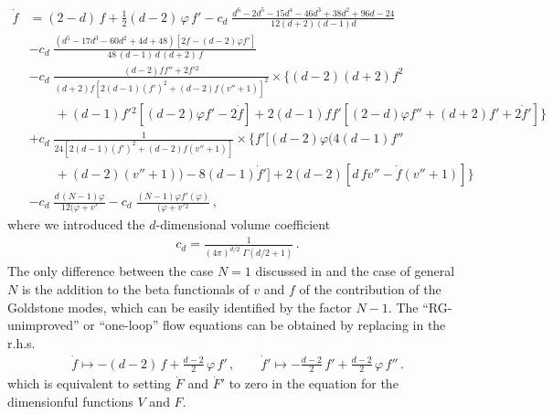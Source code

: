 \documentclass[11pt]{book} %
\begin{document}
\begin{align}
  \dot f &= (2-d) \, f + \frac{1}{2} (d-2) \, \varphi \, f'
    - c_d \; \frac{d^6 - 2 d^5 - 15 d^4 - 46 d^3 + 38 d^2 + 96 d - 24}{12 (d+2) (d-1) d} \nonumber \\[3mm]
  & - c_d \; \frac{ \left( d^5 - 17 d^3 - 60 d^2 + 4 d + 48 \right) \left[ 2 \dot f - (d - 2) \varphi f' \right] }
    { 48 \, (d-1) \, d \, (d+2) \, f } \nonumber \\[3mm]
  & - c_d \; \frac{ (d-2) f f'' + 2 f'{}^2 }
                  { (d+2) f \left[ 2 (d-1) \left(f'\right)^2+(d-2) f \left(v''+1\right) \right]^2 }
                  \times \bigg\{ (d-2) (d+2) f^2 \nonumber \\[3mm]
  &          \quad \quad + (d-1) f'{}^2 \left[ (d-2) \varphi  f' - 2 \dot f \right]
                  + 2 (d - 1) f f' \left[ (2-d) \varphi  f'' + (d+2) f' + 2 \dot f' \right] \bigg\} \nonumber \\[3mm]
  & + c_d \; \frac{1}{ 24 \left[ 2 (d-1) \left(f'\right)^2+(d-2) f \left(v''+1\right) \right] }
                  \times \bigg\{ f' \Big[ (d-2) \varphi  \Big( 4 (d-1) f'' \nonumber \\[3mm]
                  &          \quad \quad + (d-2) \left( v'' + 1 \right) \Big) - 8 (d-1) \dot f' \Big] + 2 (d-2)  \left[ d\, f v''-\dot f \left(v''+1\right) \right] \bigg\} \nonumber \\[3mm]
  & - c_d \; \frac{ d \, (N-1) \varphi }{ 12(\varphi + v' }
    - c_d \; \frac{ (N-1)\varphi f'(\varphi)}{(\varphi + v'{}^2} \,,
  \label{flowffull}
 \end{align}
where we introduced the $d$-dimensional volume coefficient
\begin{align}
  \nonumber
  c_d = \frac{ 1 }{ (4\pi)^{d/2} \; \Gamma(d/2+1) } \,.
\end{align}
The only difference between the case $N=1$ discussed in \cite{Percacci:2015wwa}
and the case of general $N$ is the addition to the beta functionals
of $v$ and $f$ of the contribution of the Goldstone modes,
which can be easily identified by the factor $N-1$.
The ``RG-unimproved'' or ``one-loop''
flow equations can be obtained by replacing in the r.h.s.
\begin{align}
  \nonumber
  \dot f  \mapsto -         (d-2) \, f  + \frac{d-2}{2} \, \varphi \, f' \,,
  \qquad
  \dot f' \mapsto - \frac{d-2}{2} \, f' + \frac{d-2}{2} \, \varphi  \, f'' \,.
\end{align}
which is equivalent to setting $\dot F$ and $\dot F'$
to zero in the equation for the dimensionful functions $V$ and $F$.
\end{document}
